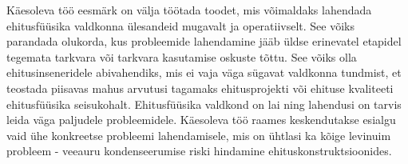 Käesoleva töö eesmärk on välja töötada toodet, mis võimaldaks lahendada ehitusfüüsika valdkonna ülesandeid mugavalt 
ja operatiivselt. See võiks parandada olukorda, kus probleemide lahendamine jääb üldse erinevatel etapidel 
tegemata tarkvara või tarkvara kasutamise oskuste tõttu. See võiks olla ehitusinseneridele abivahendiks, mis ei vaja väga sügavat 
valdkonna tundmist, et teostada piisavas mahus arvutusi tagamaks ehitusprojekti või ehituse kvaliteeti ehitusfüüsika seisukohalt.
Ehitusfüüsika valdkond on lai ning lahendusi on tarvis leida väga paljudele probleemidele. Käesoleva töö raames keskendutakse esialgu vaid
ühe konkreetse probleemi lahendamisele, mis on ühtlasi ka kõige levinuim probleem - veeauru kondenseerumise riski hindamine
ehituskonstruktsioonides.